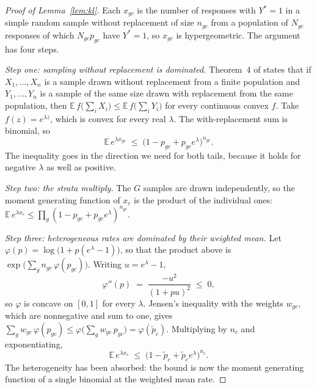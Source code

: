 \begin{proof}[Proof of Lemma~\ref{lem:kl}]
Each $x_{gc}$ is the number of responses with $Y^* = 1$ in a simple random sample without
replacement of size $n_{gc}$ from a population of $N_{gc}$ responses of which $N_{gc}p_{gc}$
have $Y^* = 1$, so $x_{gc}$ is hypergeometric. The argument has four steps.

\emph{Step one: sampling without replacement is dominated.} Theorem~4 of
\citet{hoeffding1963probability} states that if $X_1, \dots, X_n$ is a sample drawn without
replacement from a finite population and $Y_1, \dots, Y_n$ is a sample of the same size drawn
with replacement from the same population, then
$\mathbb{E}\, f\bigl(\sum_i X_i\bigr) \le \mathbb{E}\, f\bigl(\sum_i Y_i\bigr)$ for every
continuous convex $f$. Take $f(z) = e^{\lambda z}$, which is convex for every real $\lambda$.
The with-replacement sum is binomial, so
\[
\mathbb{E}\, e^{\lambda x_{gc}} \;\le\; \bigl(1 - p_{gc} + p_{gc} e^{\lambda}\bigr)^{n_{gc}} .
\]
The inequality goes in the direction we need for both tails, because it holds for negative
$\lambda$ as well as positive.

\emph{Step two: the strata multiply.} The $G$ samples are drawn independently, so the moment
generating function of $x_c$ is the product of the individual ones:
$\mathbb{E}\, e^{\lambda x_c} \le \prod_g (1 - p_{gc} + p_{gc}e^{\lambda})^{n_{gc}}$.

\emph{Step three: heterogeneous rates are dominated by their weighted mean.} Let
$\varphi(p) = \log\bigl(1 + p(e^{\lambda} - 1)\bigr)$, so that the product above is
$\exp\bigl(\sum_g n_{gc}\,\varphi(p_{gc})\bigr)$. Writing $u = e^{\lambda} - 1$,
\[
\varphi''(p) \;=\; \frac{-u^2}{(1 + pu)^2} \;\le\; 0 ,
\]
so $\varphi$ is concave on $[0,1]$ for every $\lambda$. Jensen's inequality with the weights
$w_{gc}$, which are nonnegative and sum to one, gives
$\sum_g w_{gc}\, \varphi(p_{gc}) \le \varphi\bigl(\sum_g w_{gc}\,p_{gc}\bigr) = \varphi(\tilde p_c)$.
Multiplying by $n_c$ and exponentiating,
\[
\mathbb{E}\, e^{\lambda x_c} \;\le\; \bigl(1 - \tilde p_c + \tilde p_c e^{\lambda}\bigr)^{n_c} .
\]
The heterogeneity has been absorbed: the bound is now the moment generating function of a
single binomial at the weighted mean rate.


\end{proof}
